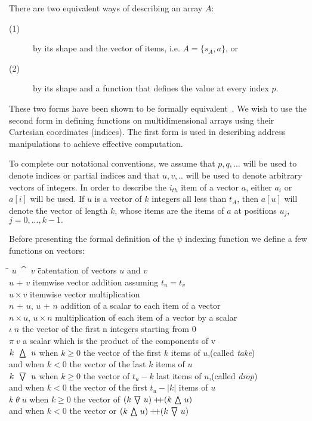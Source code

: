 There are two equivalent ways of describing an array $A$:
\begin{description}
\item[(1)] by its shape and the vector of items, i.e.  $A = \{s_A , a\}$, or
\item[(2)] by its shape and a function that defines the value at every index $p$.
\end{description}
These two forms have been shown to be formally equivalent~\cite{jenk94}.
We wish to use the second form in defining functions on multidimensional
arrays using their Cartesian coordinates (indices). 
The first form is used in describing
address manipulations to achieve effective computation.

To complete our notational conventions, we assume that $p,q,...$ will 
be used to denote
indices or partial indices and that $u,v,..$ will be used to denote 
arbitrary vectors of integers.
In order to describe the $i_{th}$ item of a vector $a$, either $a_i$ or 
$a[i]$ will be used. If $u$ is a
vector of $k$ integers all less than $t_A$, then $a[u]$
will denote the vector of length $k$, whose items are the items of $a$ at 
positions $u_j$, $j = 0,...,k-1.$

Before presenting the formal definition of the $\psi$ indexing function we 
define a few functions on vectors:
\begin{tabbing}

\hspace{.25cm}\= $u \;\cat\; v$ \hspace{1cm} \=		\=catentation of vectors $u$ and $v$ \\
\>$u$ + $v$\>		\>itemwise vector addition assuming $t_u = t_v$ \\
\>$u \times v$ \>	\>	itemwise vector multiplication \\
\>$n$ + $u$, $u$ + $n$ \>	addition of a scalar to each item of a vector \\
\>$n \times u$, $u \times n$ \>   multiplication of each item of a vector by a scalar \\
\>$\iota \; n$ \>\>  the vector of the first n integers starting from $0$ \\
\>$\pi \; v$ \> \>a scalar which is the product of the components of v \\
\>$k \;\,\bigtriangleup\, \;u$ \>\>	when $k \geq 0$ the vector of the first $k$ items of $u$,(called {\em take}) \\
\> \> \>and when $k<0$ the vector of the last $k$ items of $u$ \\
\>$k \;\,\bigtriangledown\, \;u$ \>  \> when $k \geq 0$ the vector of $t_u - k$ last items of $u$,(called{ \em drop}) \\
\> \> \>and when $k<0$ the vector of the first $t_u - |k|$ items of $u$ \\
\>$k \;\theta \;u$ \>  \>  when $k \geq 0$  the vector of $(k  \,\bigtriangledown\,  u) +\!\!\!+ ( k \,\bigtriangleup\, u ) $\\
\> \> \>and when $k<0$ the vector or $(k \,\bigtriangleup\, u ) +\!\!\!+ ( k \,\bigtriangledown\, u ) $
\end{tabbing}

